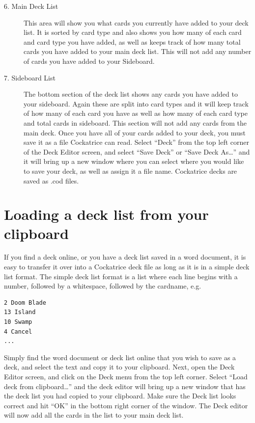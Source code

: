 \documentclass[a4paper]{scrbook}
\begin{document}
\begin{description}
 \item[6. Main Deck List]
This area will show you what cards you currently have added to your deck list. It is sorted by card type and also shows you how many of each card and card type you have added, as well as keeps track of how many total cards you have added to your main deck list. This will not add any number of cards you have added to your Sideboard.
 \item[7. Sideboard List]
The bottom section of the deck list shows any cards you have added to your sideboard. Again these are split into card types and it will keep track of how many of each card you have as well as how many of each card type and total cards in sideboard. This section will not add any cards from the main deck. Once you have all of your cards added to your deck, you must save it as a file Cockatrice can read. Select “Deck” from the top left corner of the Deck Editor screen, and select “Save Deck” or “Save Deck As…” and it will bring up a new window where you can select where you would like to save your deck, as well as assign it a file name. Cockatrice decks are saved as .cod files.
\end{description}

\section{Loading a deck list from your clipboard}
If you find a deck online, or you have a deck list saved in a word document, it is easy to transfer it over into a Cockatrice deck file as long as it is in a simple deck list format.
The simple deck list format is a list where each line begins with a number, followed by a whitespace, followed by the cardname, e.g.
\begin{verbatim}
2 Doom Blade
13 Island
10 Swamp
4 Cancel
...
\end{verbatim}

Simply find the word document or deck list online that you wish to save as a deck, and select the text and copy it to your clipboard. Next, open the Deck Editor screen, and click on the Deck menu from the top left corner. Select “Load deck from clipboard…” and the deck editor will bring up a new window that has the deck list you had copied to your clipboard. Make sure the Deck list looks correct and hit “OK” in the bottom right corner of the window. The Deck editor will now add all the cards in the list to your main deck list.
\end{document}
